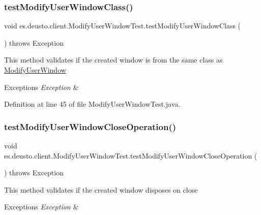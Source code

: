 \subsubsection{\texorpdfstring{test\+Modify\+User\+Window\+Class()}{testModifyUserWindowClass()}}
{\footnotesize\ttfamily void es.\+deusto.\+client.\+Modify\+User\+Window\+Test.\+test\+Modify\+User\+Window\+Class (\begin{DoxyParamCaption}{ }\end{DoxyParamCaption}) throws Exception}

This method validates if the created window is from the same class as \hyperlink{classes_1_1deusto_1_1client_1_1_modify_user_window}{Modify\+User\+Window} 
\begin{DoxyExceptions}{Exceptions}
{\em Exception} & \\
\hline
\end{DoxyExceptions}


Definition at line 45 of file Modify\+User\+Window\+Test.\+java.

\mbox{\label{classes_1_1deusto_1_1client_1_1_modify_user_window_test_ae1c496d5a25114e058f9a4b3d6ee3448}} 
\subsubsection{\texorpdfstring{test\+Modify\+User\+Window\+Close\+Operation()}{testModifyUserWindowCloseOperation()}}
{\footnotesize\ttfamily void es.\+deusto.\+client.\+Modify\+User\+Window\+Test.\+test\+Modify\+User\+Window\+Close\+Operation (\begin{DoxyParamCaption}{ }\end{DoxyParamCaption}) throws Exception}

This method validates if the created window disposes on close 
\begin{DoxyExceptions}{Exceptions}
{\em Exception} & \\
\hline
\end{DoxyExceptions}


